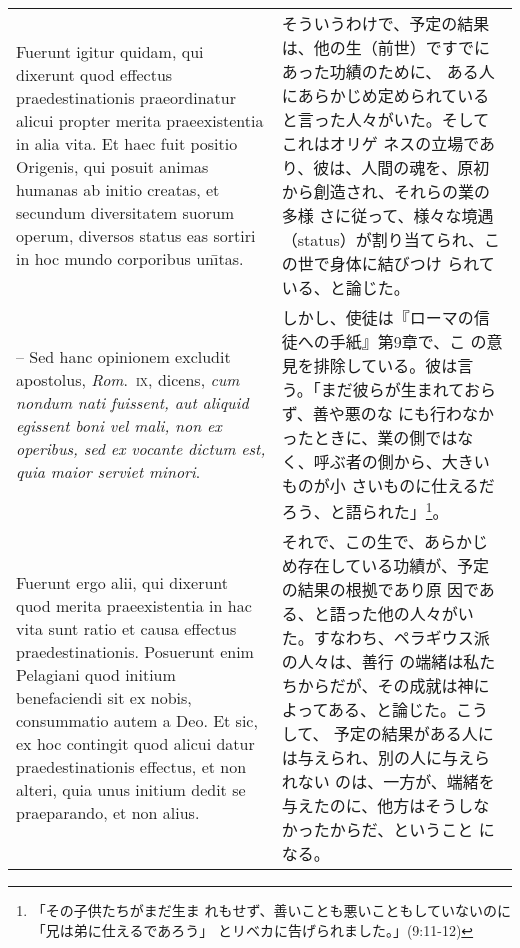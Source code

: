 \documentclass[10pt]{jsarticle} %
\begin{document}
\begin{longtable}{p{21em}p{21em}}
\\



Fuerunt igitur quidam, qui dixerunt quod effectus
praedestinationis praeordinatur alicui propter merita praeexistentia in
alia vita. Et haec fuit positio Origenis, qui posuit animas humanas ab
initio creatas, et secundum diversitatem suorum operum, diversos status
eas sortiri in hoc mundo corporibus un\={\i}tas. 



&

そういうわけで、予定の結果は、他の生（前世）ですでにあった功績のために、
 ある人にあらかじめ定められていると言った人々がいた。そしてこれはオリゲ
 ネスの立場であり、彼は、人間の魂を、原初から創造され、それらの業の多様
 さに従って、様々な境遇（status）が割り当てられ、この世で身体に結びつけ
 られている、と論じた。



\\



-- Sed hanc opinionem excludit
apostolus, {\itshape Rom}.~{\scshape ix}, dicens, {\itshape cum nondum nati fuissent, aut aliquid
egissent boni vel mali, non ex operibus, sed ex vocante dictum est, quia
maior serviet minori}. 


&

しかし、使徒は『ローマの信徒への手紙』第9章で、こ
 の意見を排除している。彼は言う。「まだ彼らが生まれておらず、善や悪のな
 にも行わなかったときに、業の側ではなく、呼ぶ者の側から、大きいものが小
 さいものに仕えるだろう、と語られた」\footnote{「その子供たちがまだ生ま
 れもせず、善いことも悪いこともしていないのに「兄は弟に仕えるであろう」
 とリベカに告げられました。」(9:11-12)}。


\\


Fuerunt ergo alii, qui dixerunt quod merita
praeexistentia in hac vita sunt ratio et causa effectus
praedestinationis. Posuerunt enim Pelagiani quod initium benefaciendi
sit ex nobis, consummatio autem a Deo. Et sic, ex hoc contingit quod
alicui datur praedestinationis effectus, et non alteri, quia unus
initium dedit se praeparando, et non alius. 


&

それで、この生で、あらかじめ存在している功績が、予定の結果の根拠であり原
 因である、と語った他の人々がいた。すなわち、ペラギウス派の人々は、善行
 の端緒は私たちからだが、その成就は神によってある、と論じた。こうして、
 予定の結果がある人には与えられ、別の人に与えられない
 のは、一方が、端緒を与えたのに、他方はそうしなかったからだ、ということ
 になる。



\end{longtable}
\end{document}
